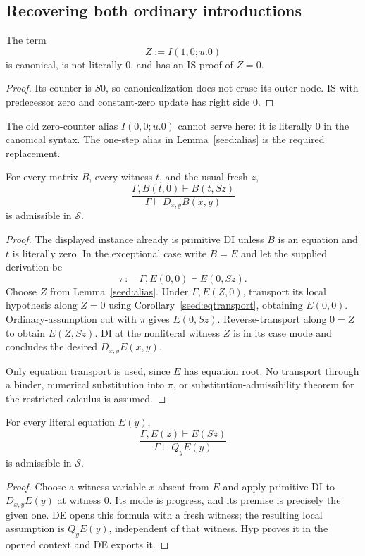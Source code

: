 \subsection{Recovering both ordinary introductions}

\begin{lemma}\label{seed:alias}
The term
\[
 Z:=I(1,0;u.0)
\]
is canonical, is not literally $0$, and has an IS proof of $Z=0$.
\end{lemma}
\begin{proof}
Its counter is $S0$, so canonicalization does not erase its outer node.
IS with predecessor zero and constant-zero update has right side $0$.
\end{proof}

The old zero-counter alias $I(0,0;u.0)$ cannot serve here: it is literally
$0$ in the canonical syntax. The one-step alias in
Lemma~\ref{seed:alias} is the required replacement.

\begin{lemma}\label{seed:case}
For every matrix $B$, every witness $t$, and the usual fresh $z$,
\[
 \frac{\Gamma,B(t,0)\vdash B(t,Sz)}
 {\Gamma\vdash D_{x,y}B(x,y)}
 \tag{D-case}\label{seed:Dcase}
\]
is admissible in $\mathcal S$.
\end{lemma}
\begin{proof}
The displayed instance already is primitive DI unless $B$ is an equation
and $t$ is literally zero. In the exceptional case write $B=E$ and
let the supplied derivation be
\[
 \pi:\quad\Gamma,E(0,0)\vdash E(0,Sz).
\]
Choose $Z$ from Lemma~\ref{seed:alias}. Under
$\Gamma,E(Z,0)$, transport its local hypothesis along $Z=0$ using
Corollary~\ref{seed:eqtransport}, obtaining $E(0,0)$.
Ordinary-assumption cut with $\pi$ gives $E(0,Sz)$.
Reverse-transport along $0=Z$ to obtain $E(Z,Sz)$.
DI at the nonliteral witness $Z$ is in its case mode and concludes
the desired $D_{x,y}E(x,y)$.

Only equation transport is used, since $E$ has equation root.
No transport through a binder, numerical substitution into $\pi$, or
substitution-admissibility theorem for the restricted calculus is assumed.
\end{proof}

\begin{lemma}\label{seed:progress}
For every literal equation $E(y)$,
\[
 \frac{\Gamma,E(z)\vdash E(Sz)}{\Gamma\vdash Q_yE(y)}
 \tag{Q-progress}\label{seed:Qprogress}
\]
is admissible in $\mathcal S$.
\end{lemma}
\begin{proof}
Choose a witness variable $x$ absent from $E$ and apply primitive DI
to $D_{x,y}E(y)$ at witness $0$. Its mode is progress, and its premise
is precisely the given one. DE opens this formula with a fresh witness;
the resulting local assumption is $Q_yE(y)$, independent of that witness.
Hyp proves it in the opened context and DE exports it.
\end{proof}

